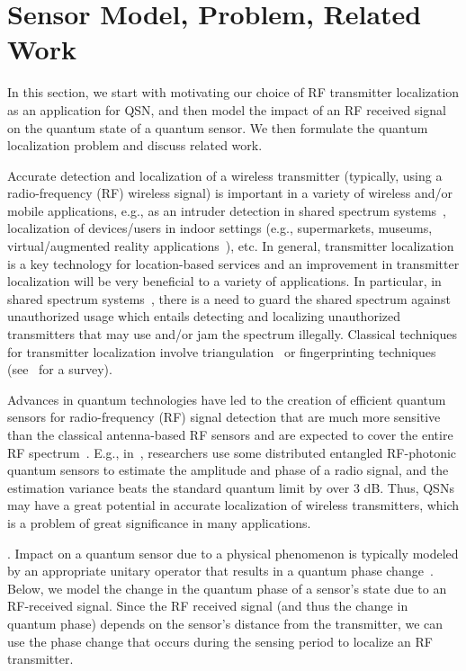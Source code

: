 \section{Sensor Model, Problem, Related Work}
\label{sec:quantum_problem}

In this section, we start with motivating our choice of RF transmitter localization as an application for QSN, and then model the impact of an RF received signal on the quantum state of a quantum sensor. We then formulate the quantum localization problem and discuss related work.

Accurate detection and localization of a wireless transmitter 
(typically, using a radio-frequency (RF) wireless signal) is important in a 
variety of wireless and/or mobile
applications, e.g.,
as an intruder detection in shared spectrum systems~\cite{arani2018}, localization of devices/users in
indoor settings (e.g., supermarkets, museums, virtual/augmented reality applications~\cite{sigcomm22-cyclops}), 
etc. In general,
transmitter localization is a key technology for location-based services and an 
improvement in transmitter localization will be very
beneficial to a variety of applications.
In particular, 
in shared spectrum systems~\cite{arani2018}, there is a need to guard the shared spectrum
against unauthorized usage which entails detecting and localizing unauthorized transmitters that may
use and/or jam the spectrum illegally.
Classical techniques for transmitter localization involve triangulation~\cite{nsdi13-arraytrack} or fingerprinting techniques~\cite{infocom00-radar} (see~\cite{localization-survey} for a survey).

Advances in quantum technologies have led to the creation of efficient quantum sensors for
radio-frequency (RF) signal detection that are much more sensitive than the classical 
antenna-based RF sensors and are expected to cover the entire 
RF spectrum~\cite{PhysRevApplied.rydberg}. 
E.g., in~\cite{PRL20-qsn},
researchers use some distributed entangled RF-photonic quantum
sensors to estimate the amplitude and phase of a radio
signal, and the estimation variance beats the standard quantum
limit by over 3 dB. 
Thus, QSNs may have a great potential in accurate localization of wireless 
transmitters, which is a problem of great significance in many applications.

. 
Impact on a quantum sensor due to a physical phenomenon is typically modeled by an appropriate unitary operator that results in a quantum phase change~\cite{RevModPhys.quantumsensing}. 
Below, we model the change in the quantum phase
of a sensor's state due to an RF-received signal. 
Since the RF received signal (and thus the change in quantum phase) depends on the sensor's distance 
from the transmitter, we can use the phase change that occurs 
during the sensing period to localize an RF transmitter.

